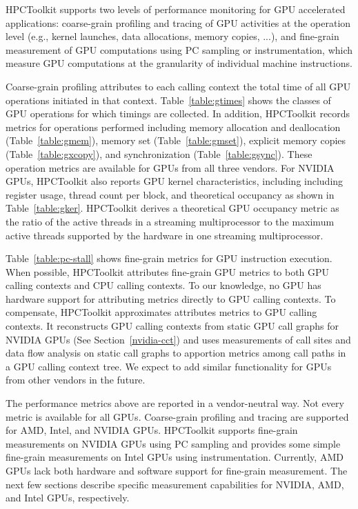 HPCToolkit supports two levels of performance monitoring for GPU accelerated applications: coarse-grain profiling and tracing of GPU activities at the operation level (e.g., kernel launches, data allocations, memory copies, ...), and fine-grain measurement of GPU computations using PC sampling or instrumentation, which measure GPU computations at the granularity of individual machine instructions.

Coarse-grain profiling attributes to each calling context the total time of all GPU operations initiated in that context. Table~\ref{table:gtimes} shows the classes of GPU operations for which timings are collected. In addition, HPCToolkit records metrics for operations performed including memory allocation and deallocation (Table~\ref{table:gmem}), memory set (Table~\ref{table:gmset}), explicit memory copies (Table~\ref{table:gxcopy}), and synchronization (Table~\ref{table:gsync}). These operation metrics are available for GPUs from all three vendors. 
For NVIDIA GPUs, HPCToolkit also reports GPU kernel characteristics, including including register usage, thread count per block, and theoretical occupancy as shown in Table~\ref{table:gker}. HPCToolkit derives a theoretical GPU occupancy metric as the ratio of the active threads in a streaming multiprocessor to the maximum active threads supported by the hardware in one streaming multiprocessor.

Table~\ref{table:pc-stall} shows fine-grain metrics for GPU instruction execution.
When possible, HPCToolkit attributes fine-grain GPU metrics to both GPU calling contexts and CPU calling contexts.
To our knowledge, no GPU has hardware support for attributing metrics directly to GPU calling contexts.
To compensate, HPCToolkit approximates attributes metrics to GPU calling contexts. It reconstructs GPU calling contexts from static GPU call graphs for 
NVIDIA GPUs (See Section~\ref{nvidia-cct}) and uses measurements of call sites and data flow analysis on static call graphs to apportion metrics among call paths in a GPU calling context tree.
We expect to add similar functionality for GPUs from other vendors in the future.

The performance metrics above are reported in a vendor-neutral way. Not every metric is available for all GPUs.
Coarse-grain profiling and tracing are supported for AMD, Intel, and NVIDIA GPUs. HPCToolkit supports fine-grain measurements on NVIDIA GPUs using PC sampling and provides some simple fine-grain measurements on Intel GPUs using instrumentation. 
Currently, AMD GPUs lack both hardware and software support for fine-grain measurement.  The next few sections describe specific measurement capabilities for NVIDIA, AMD, and Intel GPUs, respectively.


